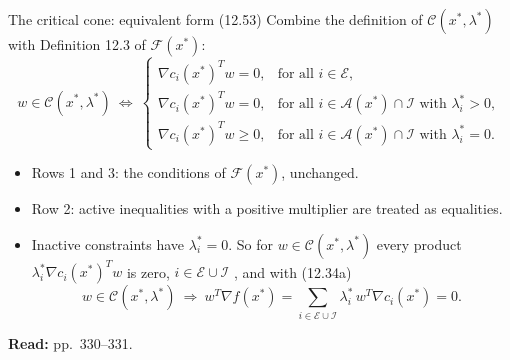 \documentclass[aspectratio=169,12pt]{beamer}
\newcommand{\xs}{x^{*}}
\newcommand{\gradf}{\nabla f}
\newcommand{\eqn}[1]{\text{\small(#1)}}
\newcommand{\readbook}[1]{{\color{red}\textbf{Read:} #1}}
\newcommand{\ls}{\lambda^{*}}
\newcommand{\cA}{\mathcal{A}}
\newcommand{\cC}{\mathcal{C}}
\newcommand{\cE}{\mathcal{E}}
\newcommand{\cF}{\mathcal{F}}
\newcommand{\cI}{\mathcal{I}}
\begin{document}
\begin{frame}{The critical cone: equivalent form (12.53)}
  Combine the definition of $\cC(\xs,\ls)$ with Definition 12.3 of $\cF(\xs)$:
  \[ w\in\cC(\xs,\ls)\ \Leftrightarrow\
     \begin{cases}
       \nabla c_{i}(\xs)^{T}w=0, & \text{for all } i\in\cE,\\
       \nabla c_{i}(\xs)^{T}w=0, & \text{for all } i\in\cA(\xs)\cap\cI \text{ with } \ls_{i}>0,\\
       \nabla c_{i}(\xs)^{T}w\ge 0, & \text{for all } i\in\cA(\xs)\cap\cI \text{ with } \ls_{i}=0.
     \end{cases} \tag{12.53} \]
  \begin{itemize}\setlength\itemsep{0.35em}
    \item Rows 1 and 3: the conditions of $\cF(\xs)$, unchanged.
    \item Row 2: active inequalities with a positive multiplier are treated as equalities.
    \item Inactive constraints have $\ls_{i}=0$. So for $w\in\cC(\xs,\ls)$ every product
      $\ls_{i}\nabla c_{i}(\xs)^{T}w$ is zero, $i\in\cE\cup\cI$ \eqn{12.54}, and with (12.34a)
      \[ w\in\cC(\xs,\ls)\ \Rightarrow\ w^{T}\gradf(\xs)=\sum_{i\in\cE\cup\cI}\ls_{i}\,w^{T}\nabla c_{i}(\xs)=0 . \tag{12.55} \]
  \end{itemize}
  \readbook{pp.~330--331.}
\end{frame}
\end{document}
